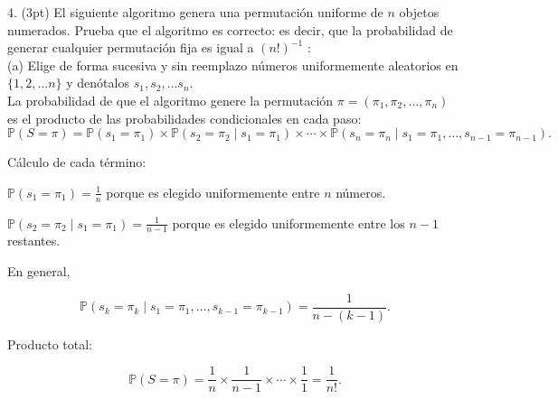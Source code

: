 \QED

4. (3pt) El siguiente algoritmo genera una permutación uniforme de \( n \) objetos numerados. Prueba que el algoritmo es correcto: es decir, que la probabilidad de generar cualquier permutación fija es igual a \( (n!)^{-1} \) :\\
(a) Elige de forma sucesiva y sin reemplazo números uniformemente aleatorios en \( \{1,2, \ldots n\} \) y denótalos \( s_{1}, s_{2}, \ldots s_{n} \). \\



La probabilidad de que el algoritmo genere la permutación \( \pi = (\pi_1, \pi_2, \ldots, \pi_n) \) es el producto de las probabilidades condicionales en cada paso:
\[
\mathbb{P}(S = \pi) = \mathbb{P}(s_1 = \pi_1) \times \mathbb{P}(s_2 = \pi_2 \mid s_1 = \pi_1) \times \cdots \times \mathbb{P}(s_n = \pi_n \mid s_1 = \pi_1, \ldots, s_{n-1} = \pi_{n-1}).
\]

Cálculo de cada término:



\(\mathbb{P}(s_1 = \pi_1) = \frac{1}{n}\) porque es elegido uniformemente entre \( n \) números.


\(\mathbb{P}(s_2 = \pi_2 \mid s_1 = \pi_1) = \frac{1}{n-1}\) porque es elegido uniformemente entre los \( n - 1 \) restantes.


En general,


\[
\mathbb{P}(s_k = \pi_k \mid s_1 = \pi_1, \ldots, s_{k-1} = \pi_{k-1}) = \frac{1}{n - (k-1)}.
\]

Producto total:

\[
\mathbb{P}(S = \pi) = \frac{1}{n} \times \frac{1}{n-1} \times \cdots \times \frac{1}{1} = \frac{1}{n!}.
\]

\QED